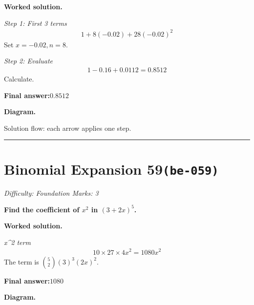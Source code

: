 \documentclass[11pt]{article}
\newcommand{\question}[1]{\par\medskip\noindent\textbf{#1}\par}
\begin{document}
\textbf{Worked solution.}

\textit{Step 1: First 3 terms}
\[\begin{gathered}
1 + 8(-0.02) + 28(-0.02)^2
\end{gathered}\]
Set \( x = -0.02, n = 8 \).

\textit{Step 2: Evaluate}
\[\begin{gathered}
1 - 0.16 + 0.0112 = 0.8512
\end{gathered}\]
Calculate.

\begin{answerbox}
\textbf{Final answer:}\quad \(\displaystyle 0.8512\)
\end{answerbox}
\textbf{Diagram.}

\begin{center}
\end{center}
\small Solution flow: each arrow applies one step.\normalsize

\medskip\hrule

\section*{Binomial Expansion 59\quad\small\texttt{(be-059)}}
\textit{Difficulty: Foundation \quad\textbar\quad Marks: 3}

\question{Find the coefficient of \( x^2 \) in \( (3 + 2x)^5 \).}

\textbf{Worked solution.}

\textit{x\textasciicircum 2 term}
\[\begin{gathered}
10 \times 27 \times 4x^2 = 1080x^2
\end{gathered}\]
The term is \( \binom{5}{2}(3)^3(2x)^2 \).

\begin{answerbox}
\textbf{Final answer:}\quad \(\displaystyle 1080\)
\end{answerbox}
\textbf{Diagram.}
\end{document}
